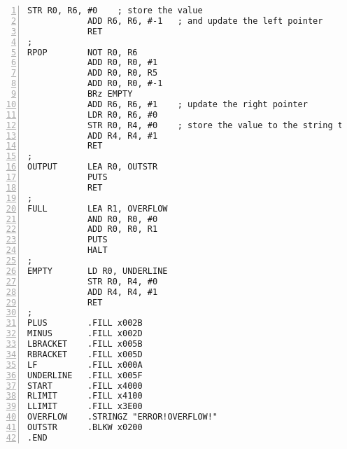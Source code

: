 \documentclass[a4paper, 12pt]{article}
\begin{document}
\begin{Verbatim}[frame = single, numbers = left, fontsize = \footnotesize]
            STR R0, R6, #0    ; store the value
            ADD R6, R6, #-1   ; and update the left pointer
            RET
;
RPOP        NOT R0, R6
            ADD R0, R0, #1
            ADD R0, R0, R5
            ADD R0, R0, #-1
            BRz EMPTY
            ADD R6, R6, #1    ; update the right pointer
            LDR R0, R6, #0
            STR R0, R4, #0    ; store the value to the string to be output
            ADD R4, R4, #1
            RET
;
OUTPUT      LEA R0, OUTSTR
            PUTS
            RET
;
FULL        LEA R1, OVERFLOW
            AND R0, R0, #0
            ADD R0, R0, R1
            PUTS
            HALT
;
EMPTY       LD R0, UNDERLINE
            STR R0, R4, #0
            ADD R4, R4, #1
            RET
;
PLUS        .FILL x002B
MINUS       .FILL x002D
LBRACKET    .FILL x005B
RBRACKET    .FILL x005D
LF          .FILL x000A
UNDERLINE   .FILL x005F
START       .FILL x4000
RLIMIT      .FILL x4100
LLIMIT      .FILL x3E00
OVERFLOW    .STRINGZ "ERROR!OVERFLOW!"
OUTSTR      .BLKW x0200
.END
\end{Verbatim}
\linespread{0.9}      %
\end{document}
